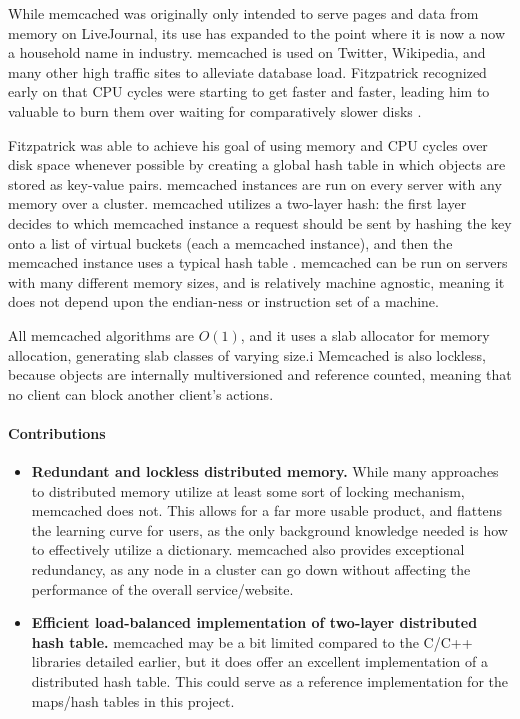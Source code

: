 	While memcached was originally only intended to serve pages and data from memory on LiveJournal, its use has expanded to the point where it is now a now a household name in industry. memcached is used on Twitter, Wikipedia, and many other high traffic sites to alleviate database load. Fitzpatrick recognized early on that CPU cycles were starting to get faster and faster, leading him to valuable to burn them over waiting for comparatively slower disks \cite{memcached_linux}. 

	Fitzpatrick was able to achieve his goal of using memory and CPU cycles over disk space whenever possible by creating a global hash table in which objects are stored as key-value pairs. memcached instances are run on every server with any memory over a cluster.  memcached utilizes a two-layer hash: the first layer decides to which memcached instance a request should be sent by hashing the key onto a list of virtual buckets (each a memcached instance), and then the memcached instance uses a typical hash table \cite{memcached_linux}. memcached can be run on servers with many different memory sizes, and is relatively machine  agnostic, meaning it does not depend upon the endian-ness or instruction set of a machine. 


	All memcached algorithms are $O(1)$, and it uses a slab allocator for memory allocation, generating slab classes of varying size.i Memcached is also lockless, because objects are internally multiversioned and reference counted, meaning that no client can block another client's actions.  

	\paragraph{Contributions}
	\begin{itemize}
		\item \textbf{Redundant and lockless distributed memory.} While many approaches to distributed memory utilize at least some sort of locking mechanism, memcached does not. This allows for a far more usable product, and flattens the learning curve for users, as the only background knowledge needed is how to effectively utilize a dictionary. memcached also provides exceptional redundancy, as any node in a cluster can go down without affecting the performance of the overall service/website.  
		\item \textbf{Efficient load-balanced implementation of two-layer distributed hash table.} memcached may be a bit limited compared to the C/C++ libraries detailed earlier, but it does offer an excellent implementation of a distributed hash table. This could serve as a reference implementation for the maps/hash tables in this project. 
	\end{itemize}
